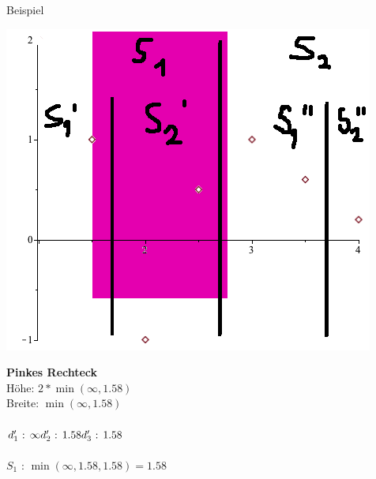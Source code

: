 \documentclass[18pt]{beamer}
\begin{document}
		\begin{frame}{Beispiel}
			\begin{minipage}{0.45\textwidth}
				\includegraphics[width =\textwidth]{logos/PlotsBetter0gg.png}
			\end{minipage}
			\begin{minipage}{0.45\textwidth}
				\textbf{Pinkes Rechteck}\\
				Höhe: $ 2 * \min(\infty, 1.58)$\\ Breite: $ \min(\infty, 1.58) $\\
				\ \\
				$d_1' \text{ : }  \infty \\
				d_2'  \text{ : }  1.58 \\
				d_3'  \text{ : }  1.58$ \\ 
				\ \\
				$S_1 \text{ : } \min(\infty, 1.58, 1.58) = 1.58$
			\end{minipage}
		\end{frame}
\end{document}

